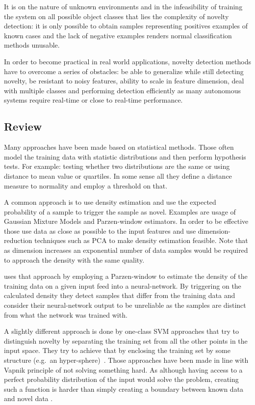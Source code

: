 It is on the nature of unknown environments and in the infeasibility of
training the system on all possible object classes that lies the complexity of
novelty detection: it is only possible to obtain samples representing positives
examples of known cases and the lack of negative examples renders normal
classification methods unusable.

In order to become practical in real world applications, novelty detection
methods have to overcome a series of obstacles:
be able to generalize while still detecting novelty,
be resistant to noisy features,
ability to scale in feature dimension,
deal with multiple classes and performing detection efficiently as many
autonomous systems require real-time or close to real-time performance.

\subsection{Review}
Many approaches have been made based on statistical methods. Those often model
the training data with statistic distributions and then perform hypothesis tests.
For example: testing whether two distributions are the same or using distance to
mean value or quartiles.
In some sense all they define a distance measure to normality and employ a
threshold on that.

A common approach is to use density estimation and use the expected probability
of a sample to trigger the sample as novel. Examples are usage of
Gaussian Mixture Models and Parzen-window estimators. In order to be effective
those use data as close as possible to the input features and use
dimension-reduction techniques such as \gls{PCA} to make density
estimation feasible. Note that as dimension increases an exponential number
of data samples would be required to approach the density with the same quality.

\cite{bishop1994novelty} uses that approach by employing a Parzen-window to
estimate the density of the training data on a given input feed into a
neural-network. By triggering on the calculated density they detect samples
that differ from the training data and consider their neural-network output
to be unreliable as the samples are distinct from what the network was trained
with.

A slightly different approach is done by one-class \gls{SVM} approaches that
try to distinguish novelty by separating the training set from all the other
points in the input space. They try to achieve that by enclosing the training
set by some structure (e.g.\ an hyper-sphere)~\cite{bennett2000support}.
Those approaches have been made in line with Vapnik principle of not solving
something hard. As although having access to a perfect probability distribution
of the input would solve the problem, creating such a function is harder than
simply creating a boundary between known data and novel data
\cite{scholkopf2000support}.

